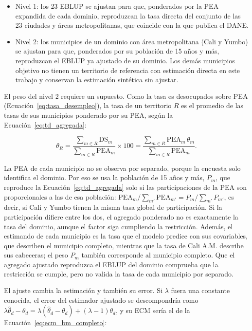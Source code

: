 \begin{itemize}
    \item Nivel 1: los 23 EBLUP se ajustan para que, ponderados por la PEA expandida de cada dominio, reproduzcan la tasa directa del conjunto de las 23 ciudades y áreas metropolitanas, que coincide con la que publica el DANE.
    \item Nivel 2: los municipios de un dominio con área metropolitana (Cali y Yumbo) se ajustan para que, ponderados por su población de 15 años y más, reproduzcan el EBLUP ya ajustado de su dominio. Los demás municipios objetivo no tienen un territorio de referencia con estimación directa en este trabajo y conservan la estimación sintética sin ajustar.
\end{itemize}

El peso del nivel 2 requiere un supuesto. Como la tasa es desocupados sobre PEA (Ecuación~\ref{eq:tasa_desempleo}), la tasa de un territorio $R$ es el promedio de las tasas de sus municipios ponderado por su PEA, según la Ecuación~\ref{eq:td_agregada}:

\begin{equation}
    \theta_R = \frac{\sum_{m \in R} \text{DS}_m}{\sum_{m \in R} \text{PEA}_m}\times 100 = \frac{\sum_{m \in R} \text{PEA}_m\,\theta_m}{\sum_{m \in R} \text{PEA}_m} .
    \label{eq:td_agregada}
\end{equation}

La PEA de cada municipio no se observa por separado, porque la encuesta solo identifica el dominio. Por eso se usa la población de 15 años y más, $P_m$, que reproduce la Ecuación~\ref{eq:td_agregada} solo si las participaciones de la PEA son proporcionales a las de esa población: $\text{PEA}_m / \sum_{m'} \text{PEA}_{m'} = P_m / \sum_{m'} P_{m'}$, es decir, si Cali y Yumbo tienen la misma tasa global de participación. Si la participación difiere entre los dos, el agregado ponderado no es exactamente la tasa del dominio, aunque el factor siga cumpliendo la restricción. Además, el estimando de cada municipio es la tasa que el modelo predice con sus covariables, que describen el municipio completo, mientras que la tasa de Cali A.M. describe sus cabeceras; el peso $P_m$ también corresponde al municipio completo. Que el agregado ajustado reproduzca el EBLUP del dominio comprueba que la restricción se cumple, pero no valida la tasa de cada municipio por separado.

El ajuste cambia la estimación y también su error. Si $\lambda$ fuera una constante conocida, el error del estimador ajustado se descompondría como $\lambda\hat{\theta}_d - \theta_d = \lambda(\hat{\theta}_d - \theta_d) + (\lambda-1)\theta_d$, y su ECM sería el de la Ecuación~\ref{eq:ecm_bm_completo}:

